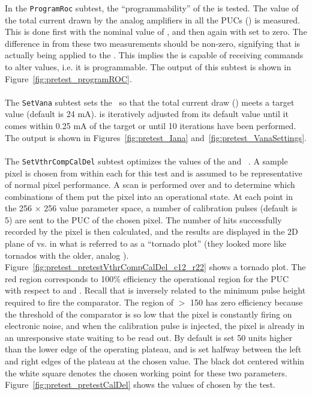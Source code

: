 In the {\tt ProgramRoc} subtest, the ``programmability'' of the \roc is tested.
The value of the total current drawn by the analog amplifiers in all the PUCs (\iana) is measured.
This is done first with the nominal value of \vana, and then again with \vana set to zero.
The difference in \iana from these two measurements should be non-zero,
signifying that \vana is actually being applied to the \roc.
This implies the \roc is capable of receiving commands to alter \dac values, i.e. it is programmable.
The output of this subtest is shown in Figure~\ref{fig:pretest_programROC}.
\\\\
The {\tt SetVana} subtest sets the \vana~\dac so that the total current draw (\iana) meets a target value (default is 24 mA).
\vana is iteratively adjusted from its default value until it comes within 0.25 mA of the target 
or until 10 iterations have been performed.  The output is shown in Figures~\ref{fig:pretest_Iana} and~\ref{fig:pretest_VanaSettings}.
\\\\
The {\tt SetVthrCompCalDel} subtest optimizes the values of the \vthrcomp and \caldel~\dacs.
A sample pixel is chosen from within each \roc for this test and is assumed to be representative of normal pixel performance.
A scan is performed over \vthrcomp and \caldel to determine which combinations of them put the pixel into an operational state.
At each point in the 256 $\times$ 256 value parameter space,
a number of calibration pulses (default is 5) are sent to the PUC of the chosen pixel.
The number of hits successfully recorded by the pixel is then calculated,
and the results are displayed in the 2D plane of \vthrcomp vs. \caldel 
in what is referred to as a ``tornado plot'' (they looked more like tornados with the older, analog \roc).
Figure~\ref{fig:pretest_pretestVthrCompCalDel_c12_r22} shows a tornado plot.
The red region corresponds to 100\% efficiency \textendash\xspace 
the operational region for the PUC with respect to \vthrcomp and \caldel.
Recall that \vthrcomp is inversely related to the minimum pulse height required to fire the comparator.
The region of \vthrcomp $>$ 150 has zero efficiency because
the threshold of the comparator is so low that the pixel is constantly firing on electronic noise,
and when the calibration pulse is injected,
the pixel is already in an unresponsive state waiting to be read out.
By default \vthrcomp is set 50 units higher than the lower edge of the operating plateau,
and \caldel is set halfway between the left and right edges of the plateau at the chosen \vthrcomp value.
The black dot centered within the white square denotes the chosen working point for these two parameters.
Figure~\ref{fig:pretest_pretestCalDel} shows the values of \caldel chosen by the test.

